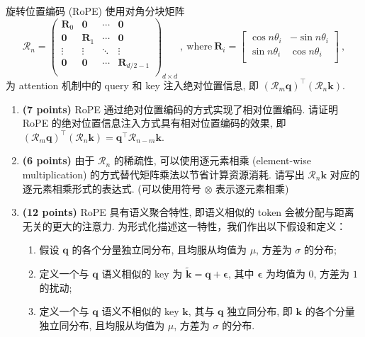 \documentclass[8pt]{article}
\newcommand{\points}[1]{\textbf{(#1 points)}}
\begin{document}
{\color{gray}
旋转位置编码 (RoPE) 使用对角分块矩阵
\begin{equation}
    \boldsymbol{\mathcal{R}}_n = 
    \left(
    \begin{array}{cccc}
        \mathbf{R}_0 & \mathbf{0}   & \cdots & \mathbf{0}         \\
        \mathbf{0}   & \mathbf{R}_1 & \cdots & \mathbf{0}         \\
        \vdots       & \vdots       & \ddots & \vdots             \\
        \mathbf{0}   & \mathbf{0}   & \cdots & \mathbf{R}_{d/2-1} \\
    \end{array}
    \right)_{d\times d}
    \ , \ 
    \text{where}\ \mathbf{R}_i = \left[
    \begin{array}{cc}
        \cos n\theta_i & -\sin n\theta_i \\
        \sin n\theta_i &  \cos n\theta_i \\
    \end{array} 
    \right] \ , 
\end{equation}
为 attention 机制中的 query 和 key 注入绝对位置信息, 即 $(\boldsymbol{\mathcal{R}}_m \mathbf{q})^{\top}(\boldsymbol{\mathcal{R}}_n \mathbf{k})$.
\begin{enumerate}
    \item \points{7} RoPE 通过绝对位置编码的方式实现了相对位置编码. 请证明 RoPE 的绝对位置信息注入方式具有相对位置编码的效果, 即 $(\boldsymbol{\mathcal{R}}_m \mathbf{q})^{\top}(\boldsymbol{\mathcal{R}}_n \mathbf{k})=\mathbf{q}^{\top}\boldsymbol{\mathcal{R}}_{n-m} \mathbf{k}$. 
    \item \points{6} 由于 $\boldsymbol{\mathcal{R}}_n$ 的稀疏性, 可以使用逐元素相乘 (element-wise multiplication) 的方式替代矩阵乘法以节省计算资源消耗. 
    请写出 $\boldsymbol{\mathcal{R}}_n \mathbf{k}$ 对应的逐元素相乘形式的表达式. 
    (可以使用符号 $\otimes$ 表示逐元素相乘) 
    \item \points{12} RoPE 具有语义聚合特性, 即语义相似的 token 会被分配与距离无关的更大的注意力. 
    为形式化描述这一特性，我们作出以下假设和定义：
    \begin{enumerate}
        \item 假设 $\mathbf{q}$ 的各个分量独立同分布, 且均服从均值为 $\mu$, 方差为 $\sigma$ 的分布; 
        \item 定义一个与 $\mathbf{q}$ 语义相似的 key 为 $\tilde{\mathbf{k}} = \mathbf{q} + \boldsymbol{\epsilon}$, 其中 $\boldsymbol{\epsilon}$ 为均值为 $0$, 方差为 $1$ 的扰动;
        \item 定义一个与 $\mathbf{q}$ 语义不相似的 key $\mathbf{k}$, 其与 $\mathbf{q}$ 独立同分布, 即 $\mathbf{k}$ 的各个分量独立同分布, 且均服从均值为 $\mu$, 方差为 $\sigma$ 的分布.

\end{enumerate}
\end{enumerate}}
\end{document}
